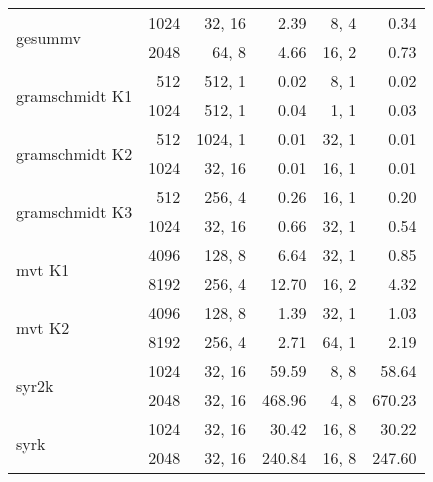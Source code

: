 \begin{table}[htb]
\begin{tabular}{|l|r||r|r||r|r|}
\hline
\multirow{2}{*}{{\scriptsize gesummv}} & 1024 & 32, 16 &   2.39 & 8, 4 &   0.34 \\
 & 2048 & 64, 8 &   4.66 & 16, 2 &   0.73 \\
\hline
\multirow{2}{*}{{\scriptsize gramschmidt K1}} & 512 & 512, 1 &   0.02 & 8, 1 &   0.02 \\
 & 1024 & 512, 1 &   0.04 & 1, 1 &   0.03 \\
\hline
\multirow{2}{*}{{\scriptsize gramschmidt K2}} & 512 & 1024, 1 &   0.01 & 32, 1 &   0.01 \\
 & 1024 & 32, 16 &   0.01 & 16, 1 &   0.01 \\
\hline
\multirow{2}{*}{{\scriptsize gramschmidt K3}} & 512 & 256, 4 &   0.26 & 16, 1 &   0.20 \\
 & 1024 & 32, 16 &   0.66 & 32, 1 &   0.54 \\
\hline
\multirow{2}{*}{{\scriptsize mvt K1}} & 4096 & 128, 8 &   6.64 & 32, 1 &   0.85 \\
 & 8192 & 256, 4 &  12.70 & 16, 2 &   4.32 \\
\hline
\multirow{2}{*}{{\scriptsize mvt K2}} & 4096 & 128, 8 &   1.39 & 32, 1 &   1.03 \\
 & 8192 & 256, 4 &   2.71 & 64, 1 &   2.19 \\
\hline
\multirow{2}{*}{{\scriptsize syr2k}} & 1024 & 32, 16 &  59.59 & 8, 8 &  58.64 \\
 & 2048 & 32, 16 & 468.96 & 4, 8 & 670.23 \\
\hline
\multirow{2}{*}{{\scriptsize syrk}} & 1024 & 32, 16 &  30.42 & 16, 8 &  30.22 \\
 & 2048 & 32, 16 & 240.84 & 16, 8 & 247.60 \\
\hline
\end{tabular}
\end{table}
